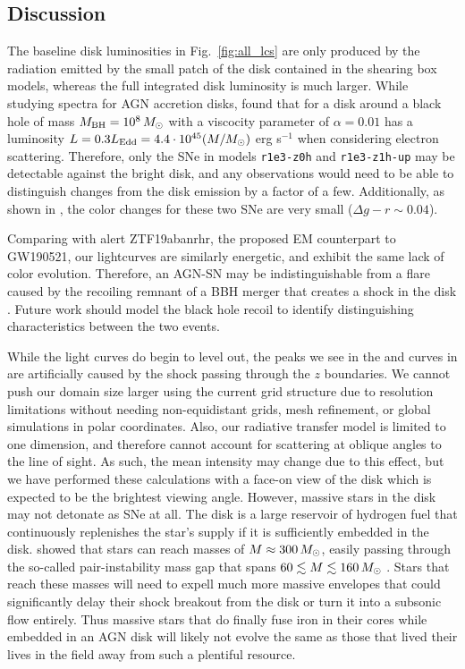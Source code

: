 \subsection{Discussion} \label{sec:discussion}

The baseline disk luminosities in Fig.~\ref{fig:all_lcs} are only produced by the radiation emitted by the small patch of the disk contained in the shearing box models, whereas the full integrated disk luminosity is much larger.
While studying spectra for AGN accretion disks, \citet{Hubeny+01} found that for a disk around a black hole of mass $M_{\rm BH}=10^8\,M_{\odot}$ with a viscocity parameter of $\alpha=0.01$ has a luminosity $L=0.3L_\text{Edd}=4.4\cdot10^{45}(M/M_{\odot})$ erg s$^{-1}$ when considering electron scattering.
Therefore, only the SNe in models \texttt{r1e3-z0h} and \texttt{r1e3-z1h-up} may be detectable against the bright disk, and any observations would need to be able to distinguish changes from the disk emission by a factor of a few.
Additionally, as shown in , the color changes for these two SNe are very small ($\Delta g-r \sim 0.04$).



Comparing with alert ZTF19abanrhr, the proposed EM counterpart to GW190521, our lightcurves are similarly energetic, and exhibit the same lack of color evolution.
Therefore, an AGN-SN may be indistinguishable from a flare caused by the recoiling remnant of a BBH merger that creates a shock in the disk \citep{McKernan+19}. 
Future work should model the black hole recoil to identify distinguishing characteristics between the two events.

While the light curves do begin to level out, the peaks we see in the  and  curves in  are artificially caused by the shock passing through the $z$ boundaries.
We cannot push our domain size larger using the current grid structure due to resolution limitations without needing non-equidistant grids,  mesh refinement, or global simulations in polar coordinates.
Also, our radiative transfer model is limited to one dimension, and therefore cannot account for scattering at oblique angles to the line of sight.
As such, the mean intensity may change due to this effect, but we have performed these calculations with a face-on view of the disk which is expected to be the brightest viewing angle.
However, massive stars in the disk may not detonate as SNe at all.
The disk is a large reservoir of hydrogen fuel that continuously replenishes the star's supply if it is sufficiently embedded in the disk.
\citet{CantielloJermynLin21} showed that stars can reach masses of $M\approx300\,M_{\odot}$, easily passing through the so-called pair-instability mass gap that spans $60\lesssim M \lesssim 160\,M_{\odot}$ \citep{WoosleyHeger21}.
Stars that reach these masses will need to expell much more massive envelopes that could significantly delay their shock breakout from the disk or turn it into a subsonic flow entirely.
Thus massive stars that do finally fuse iron in their cores while embedded in an AGN disk will likely not evolve the same as those that lived their lives in the field away from such a plentiful resource.

